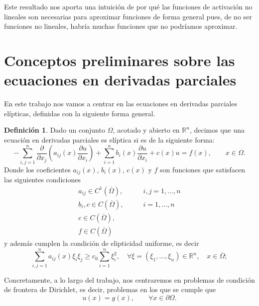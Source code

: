 \documentclass[a4paper,11pt,spanish, twoside, leqno]{tfg-uam}
\theoremstyle{definition}
\newtheorem{defin}[teor]{Definici\'on}
\begin{document}
Este resultado nos aporta una intuición de por qué las funciones de activación no lineales son necesarias para aproximar funciones de forma general pues, de no ser funciones no lineales, habría muchas funciones que no podríamos aproximar. 

\section{Conceptos preliminares sobre las ecuaciones en derivadas parciales} \label{sec:EDPs}

En este trabajo nos vamos a centrar en las ecuaciones en derivadas parciales elípticas, definidas con la siguiente forma general.

\begin{mdframed}
\begin{defin}\label{def:EDP_eliptica}
    Dado un conjunto $\Omega$, acotado y abierto en $\mathbb{R}^n$, decimos que una ecuación en derivadas parciales es elíptica si es de la siguiente forma:
    \begin{equation}\label{eq:EDP_eliptica}
        -\sum_{i,j=1}^{n} \frac{\partial}{\partial x_j}\left( a_{ij}(x)\frac{\partial u}{\partial x_i}\right) + \sum_{i=1}^{n} b_i(x)\frac{\partial u}{\partial x_i} + c(x)u = f(x), \qquad x\in\Omega.
    \end{equation}
    Donde los coeficientes $a_{ij}(x)$, $b_i(x)$, $c(x)$ y $f$ son funciones que satisfacen las siguientes condiciones
    \begin{align}
        a_{ij} \in C^1(\overline{\Omega}),& \qquad i,j = 1, \dots ,n \label{eq:condiciones_EDP_eliptica_a} \\
        b_i, c \in C(\overline{\Omega}),& \qquad i = 1, \dots ,n \\
        c \in C(\overline{\Omega}),& \\
        f\in C(\overline{\Omega})&\label{eq:condiciones_EDP_eliptica_f}
    \end{align}
    y además cumplen la condición de elipticidad uniforme, es decir
    \begin{equation}
        \sum_{i,j=1}^n a_{ij}(x) \xi_i \xi_j \geq c_0 \sum_{i=1}^n \xi_i^2, \quad \forall \xi = (\xi_1, \ldots, \xi_n) \in \mathbb{R}^n, \quad x \in \overline{\Omega};
    \end{equation}
\end{defin}
\end{mdframed}

Concretamente, a lo largo del trabajo, nos centraremos en problemas de condición de frontera de Dirichlet, es decir, problemas en los que se cumple que
\begin{equation}
    u(x) = g(x), \qquad \forall x\in\partial\Omega.
\end{equation}
\end{document}
